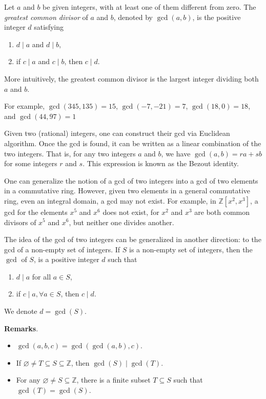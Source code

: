 \documentclass[12pt]{article}
\begin{document}
Let $a$ and $b$ be given integers, with at least one of them different from zero. The \emph{greatest common divisor} of $a$ and $b$, denoted by $\gcd(a,b)$, is the positive integer $d$ satisfying
\begin{enumerate}
\item $d\mid a$ and $d\mid b$,
\item if $c\mid a$ and $c\mid b$, then $c\mid d$.
\end{enumerate}
More intuitively, the greatest common divisor is the largest integer dividing both $a$ and $b$.

For example, $\gcd(345,135)=15$, $\gcd(-7,-21)=7$, $\gcd(18,0)=18$, and $\gcd(44,97)=1$

Given two (rational) integers, one can construct their gcd via Euclidean algorithm.  Once the gcd is found, it can be written as a linear combination of the two integers.  That is, for any two integers $a$ and $b$, we have $\operatorname{gcd}(a,b)=ra+sb$ for some integers $r$ and $s$.  This expression is known as the Bezout identity.

One can generalize the notion of a gcd of two integers into a gcd of two elements in a commutative ring.  However, given two elements in a general commutative ring, even an integral domain, a gcd may not exist.  For example, in $\mathbb{Z}[x^2,x^3]$, a gcd for the elements $x^5$ and $x^6$ does not exist, for $x^2$ and $x^3$ are both common divisors of $x^5$ and $x^6$, but neither one divides another.

The idea of the gcd of two integers can be generalized in another direction: to the gcd of a non-empty set of integers.  If $S$ is a non-empty set of integers, then the $\operatorname{gcd}$ of $S$, is a positive integer $d$ such that 
\begin{enumerate}
\item $d\mid a$ for all $a\in S$,
\item if $c\mid a, \forall a\in S$, then $c\mid d$.
\end{enumerate}
We denote $d=\operatorname{gcd}(S)$.

\textbf{Remarks}.
\begin{itemize}
\item $\gcd(a,b,c)=\gcd(\gcd(a,b),c)$.
\item If $\varnothing\ne T\subseteq S\subseteq \mathbb{Z}$, then $\gcd(S)\mid \gcd(T)$.
\item For any $\varnothing\ne S\subseteq\mathbb{Z}$, there is a finite subset $T\subseteq S$ such that $\gcd(T)=\gcd(S)$.
\end{itemize}
\end{document}
